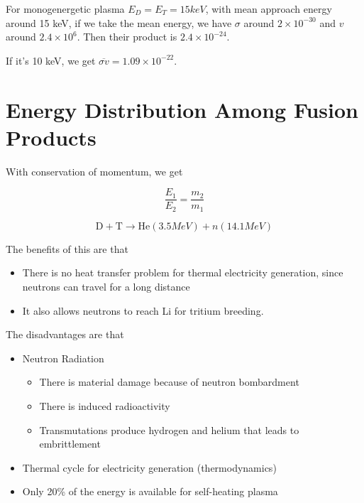 \documentclass[12pt]{article}
\begin{document}
\begin{ex}
    For monogenergetic plasma $E_D = E_T = 15\unit{keV}$, with mean approach energy around 15 keV, if we take the mean energy, we have $\sigma$ around $2 \times 10^{-30}$ and $v$ around $2.4 \times 10^6$. Then their product is $2.4 \times 10^{-24}$.

    If it's 10 keV, we get $\overline{\sigma v} = 1.09 \times 10^{-22}$.
\end{ex}

\section{Energy Distribution Among Fusion Products}

With conservation of momentum, we get

\begin{equation}
    \frac{E_1}{E_2} = \frac{m_2}{m_1}
\end{equation}

$$\text{D} + \text{T} \rightarrow \text{He}(3.5\unit{MeV}) + n(14.1\unit{MeV})$$

The benefits of this are that

\begin{itemize}
    \item There is no heat transfer problem for thermal electricity generation, since neutrons can travel for a long distance
    \item It also allows neutrons to reach Li for tritium breeding.
\end{itemize}

The disadvantages are that

\begin{itemize}
    \item Neutron Radiation
        \begin{itemize}
            \item There is material damage because of neutron bombardment
            \item There is induced radioactivity
            \item Transmutations produce hydrogen and helium that leads to embrittlement
        \end{itemize}
    \item Thermal cycle for electricity generation (thermodynamics)
    \item Only 20\% of the energy is available for self-heating plasma
\end{itemize}
\end{document}
